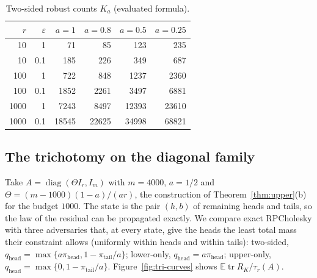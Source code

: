 \documentclass[11pt]{article}
\theoremstyle{definition}\newtheorem{definition}[theorem]{Definition}
\theoremstyle{remark}\newtheorem{remark}[theorem]{Remark}
\newcommand{\E}{\mathbb E}
\newcommand{\eps}{\varepsilon}
\newcommand{\tr}{\operatorname{tr}}
\newcommand{\diag}{\operatorname{diag}}
\newcommand{\1}{\mathbf 1}
\begin{document}
\begin{table}[ht]
\centering
\begin{tabular}{rrrrrr}
\toprule
$r$ & $\eps$ & $a=1$ & $a=0.8$ & $a=0.5$ & $a=0.25$\\
\midrule
10 & 1 & 71 & 85 & 123 & 235\\
10 & 0.1 & 185 & 226 & 349 & 687\\
100 & 1 & 722 & 848 & 1237 & 2360\\
100 & 0.1 & 1852 & 2261 & 3497 & 6881\\
1000 & 1 & 7243 & 8497 & 12393 & 23610\\
1000 & 0.1 & 18545 & 22625 & 34998 & 68821\\
\bottomrule
\end{tabular}
\caption{Two-sided robust counts $K_a$ (evaluated formula).}
\label{tab:Ka}
\end{table}

\subsection{The trichotomy on the diagonal family}
Take $A=\diag(\Theta I_r,I_m)$ with $m=4000$, $a=1/2$ and
$\Theta=(m-1000)(1-a)/(ar)$, the construction of Theorem~\ref{thm:upper}(b)
for the budget $1000$. The state is the pair $(h,b)$ of remaining heads
and tails, so the law of the residual can be propagated exactly. We
compare exact RPCholesky with three adversaries that, at every state,
give the heads the least total mass their constraint allows (uniformly
within heads and within tails): two-sided,
$q_{\mathrm{head}}=\max\{a\pi_{\mathrm{head}},1-\pi_{\mathrm{tail}}/a\}$;
lower-only, $q_{\mathrm{head}}=a\pi_{\mathrm{head}}$; upper-only,
$q_{\mathrm{head}}=\max\{0,1-\pi_{\mathrm{tail}}/a\}$.
Figure~\ref{fig:tri-curves} shows $\E\tr R_K/\tau_r(A)$.
\end{document}
